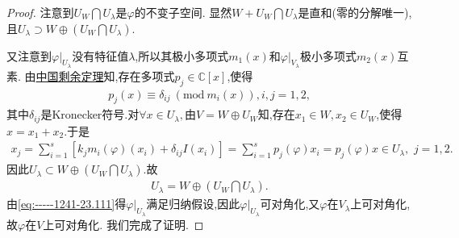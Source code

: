 \documentclass[../../main.tex]{subfiles}%
\begin{document}
\begin{proof}
注意到$U_W \bigcap U_\lambda$是$\varphi$的不变子空间. 显然$W + U_W \bigcap U_\lambda$是直和(零的分解唯一),且$U_\lambda \supset W \oplus (U_W \bigcap U_\lambda). $

又注意到$\varphi|_{U_\lambda}$没有特征值$\lambda$,所以其极小多项式$m_1(x)$和$\varphi|_{V_\lambda}$极小多项式$m_2(x)$互素. 由\hyperref[theorem:中国剩余定理(多项式版)]{中国剩余定理}知,存在多项式$p_j\in \mathbb{C}[x]$,使得
\begin{align*}
p_j(x) \equiv \delta_{ij} \ (\text{mod} \ m_i(x)), i,j = 1,2, 
\end{align*}
其中$\delta_{ij}$是Kronecker符号.对$\forall x\in U_{\lambda},$由$V=W\oplus U_W$知,存在$x_1\in W,x_2\in U_W$,使得$x=x_1+x_2.$于是
\begin{align*}
x_j=\sum_{i=1}^s{\left[ k_jm_i\left( \varphi \right) \left( x_i \right) +\delta _{ij}I\left( x_i \right) \right]}=\sum_{i=1}^s{p_j(\varphi )x_i}=p_j(\varphi )x\in U_{\lambda},\,\,j=1,2.
\end{align*}
因此$U_{\lambda}\subset W \oplus (U_W \bigcap U_\lambda)$.故
\begin{align}
U_\lambda = W \oplus (U_W \bigcap U_\lambda). \label{eq:-----1241-23.111}
\end{align}
由\eqref{eq:-----1241-23.111}得$\varphi|_{U_\lambda}$满足归纳假设,因此$\varphi|_{U_\lambda}$可对角化,又$\varphi$在$V_{\lambda}$上可对角化,故$\varphi$在$V$上可对角化. 我们完成了证明.

\end{proof}
\end{document}
